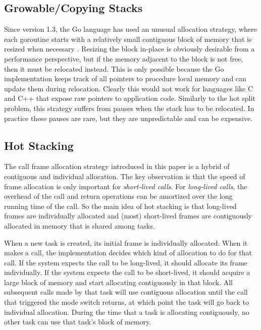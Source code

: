 \documentclass[a4paper,UKenglish,cleveref, autoref]{lipics-v2019}
\begin{document}

\subsection{Growable{\slash}Copying Stacks}
\label{sec:go_stacks}

Since version 1.3, the Go language has used an unusual allocation strategy, where each goroutine starts with a relatively small contiguous block of memory that is resized when necessary \cite{Cheney2014, Morsing2014}.
Resizing the block in-place is obviously desirable from a performance perspective, but if the memory adjacent to the block is not free, then it must be relocated instead.
This is only possible because the Go implementation keeps track of all pointers to procedure local memory and can update them during relocation.
Clearly this would not work for languages like C and C++ that expose raw pointers to application code.
Similarly to the hot split problem, this strategy suffers from pauses when the stack has to be relocated.
In practice these pauses are rare, but they are unpredictable and can be expensive.

\subsection{Hot Stacking}

The call frame allocation strategy introduced in this paper is a hybrid of contiguous and individual allocation.
The key observation is that the speed of frame allocation is only important for \emph{short-lived calls}.
For \emph{long-lived calls}, the overhead of the call and return operations can be amortized over the long running time of the call.
So the main idea of hot stacking is that long-lived frames are individually allocated and (most) short-lived frames are contiguously allocated in memory that is shared among tasks.

When a new task is created, its initial frame is individually allocated.
When it makes a call, the implementation decides which kind of allocation to do for that call.
If the system expects the call to be long-lived, it should allocate its frame individually.
If the system expects the call to be short-lived, it should acquire a large block of memory and start allocating contiguously in that block.
All subsequent calls made by that task will use contiguous allocation until the call that triggered the mode switch returns, at which point the task will go back to individual allocation.
During the time that a task is allocating contiguously, no other task can use that task's block of memory.
\end{document}
